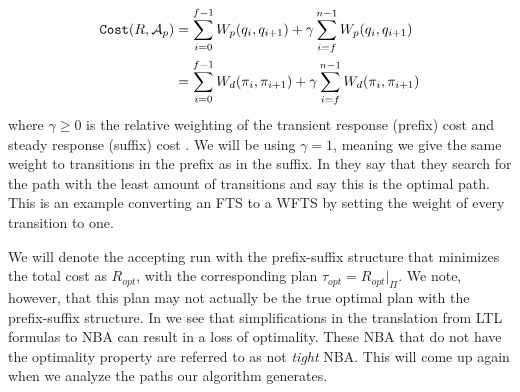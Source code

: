 \begin{align*}
\texttt{Cost} (R, \mathcal{A}_p) &= \sum_{i=0}^{f-1} W_p(q_i,q_{i+1}) + \gamma \sum_{i=f}^{n-1} W_p(q_i,q_{i+1}) \\
&= \sum_{i=0}^{f-1} W_d(\pi_i,\pi_{i+1}) + \gamma \sum_{i=f}^{n-1} W_d(\pi_i, \pi_{i+1})
\end{align*}
where $\gamma \geq 0$ is the relative weighting of the transient response (prefix) cost and steady response (suffix) cost \cite{guo15}. We will be using $\gamma = 1$, meaning we give the same weight to transitions in the prefix as in the suffix. In \cite{fainekos09} they say that they search for the path with the least amount of transitions and say this is the optimal path. This is an example converting an FTS to a WFTS by setting the weight of every transition to one.
 


We will denote the accepting run with the prefix-suffix structure that minimizes the total cost as $R_{opt}$, with the corresponding plan $\tau_{opt} = R_{opt}|_\Pi$. We note, however, that this plan may not actually be the true optimal plan with the prefix-suffix structure. In \cite{schuppan05} we see that simplifications in the translation from LTL formulas to NBA can result in a loss of optimality. These NBA that do not have the optimality property are referred to as not \textit{tight} NBA. This will come up again when we analyze the paths our algorithm generates. 